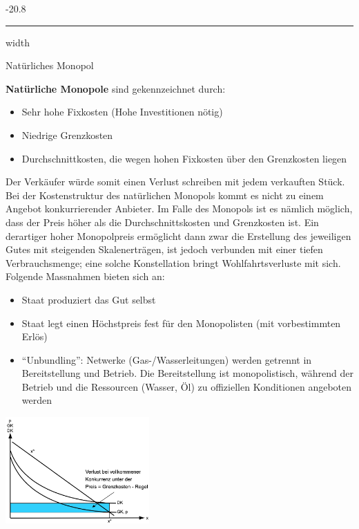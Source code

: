 \documentclass[9pt, landscape, fleqn]{scrartcl}
\makeatletter
\renewcommand{\subsubsection}{\@startsection{subsubsection}{1}{0mm}%
{-2\baselineskip}{0.8\baselineskip}%
{\hrule depth 0.2pt width\columnwidth\vspace*{1.2em}\normalsize\bfseries\rmfamily}}
\makeatother
\begin{document}
\begin{multicols*}{3}
\subsubsection{Natürliches Monopol}

\textbf{Natürliche Monopole} sind gekennzeichnet durch: 

\begin{itemize}
    \item Sehr hohe Fixkosten (Hohe Investitionen nötig)
    \item Niedrige Grenzkosten 
    \item Durchschnittkosten, die wegen hohen Fixkosten über den Grenzkosten liegen 
\end{itemize}

Der Verkäufer würde somit einen Verlust schreiben mit jedem verkauften Stück. Bei der Kostenstruktur des natürlichen Monopols kommt es nicht zu einem Angebot konkurrierender Anbieter. 
Im Falle des Monopols ist es nämlich möglich, dass der Preis höher als die Durchschnittskosten und Grenzkosten ist. Ein derartiger hoher Monopolpreis ermöglicht dann zwar die Erstellung des jeweiligen Gutes mit steigenden Skalenerträgen, ist jedoch verbunden mit einer tiefen Verbrauchsmenge; eine solche Konstellation bringt Wohlfahrtsverluste mit sich.
Folgende Massnahmen bieten sich an: 

\begin{itemize}
    \item Staat produziert das Gut selbst 
    \item Staat legt einen Höchstpreis fest für den Monopolisten (mit vorbestimmten Erlös)
    \item ``Unbundling'': Netwerke (Gas-/Wasserleitungen) werden getrennt in Bereitstellung und Betrieb. Die Bereitstellung ist monopolistisch, während der Betrieb und die Ressourcen (Wasser, Öl) zu offiziellen Konditionen angeboten werden 
\end{itemize}

\begin{center}
    \includegraphics[width=5.5cm]{Natuerliches_Monopol_Preise.png}
\end{center}


\end{multicols*}
\end{document}
